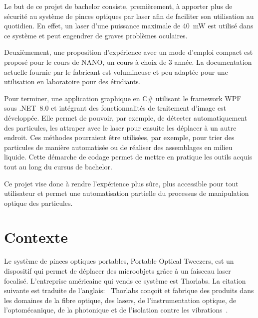 Le but de ce projet de bachelor consiste, premièrement, à apporter plus de sécurité au système de pinces optiques par laser afin de faciliter son utilisation au quotidien. En effet, un laser d'une puissance maximale de 40~mW est utilisé dans ce système et peut engendrer de graves problèmes oculaires.

Deuxièmement, une proposition d'expérience avec un mode d'emploi compact est proposé pour le cours de NANO, un cours à choix de 3\ieme{} année. La documentation actuelle fournie par le fabricant est volumineuse et peu adaptée pour une utilisation en laboratoire pour des étudiants.

Pour terminer, une application graphique en C\# utilisant le framework WPF sous .NET~8.0 et intégrant des fonctionnalités de traitement d'image est développée. Elle permet de pouvoir, par exemple, de détecter automatiquement des particules, les attraper avec le laser pour ensuite les déplacer à un autre endroit. Ces méthodes pourraient être utilisées, par exemple, pour trier des particules de manière automatisée ou de réaliser des assemblages en milieu liquide. Cette démarche de codage permet de mettre en pratique les outils acquis tout au long du cursus de bachelor.

Ce projet vise donc à rendre l'expérience plus sûre, plus accessible pour tout utilisateur et permet une automatisation partielle du processus de manipulation optique des particules.
\newpage
\section{Contexte}

Le système de pinces optiques portables, Portable Optical Tweezers, est un dispositif qui permet de déplacer des microobjets grâce à un faisceau laser focalisé. L'entreprise américaine qui vends ce système est Thorlabs. La citation suivante est traduite de l'anglais: \guillemotleft{}~Thorlabs conçoit et fabrique des produits dans les domaines de la fibre optique, des lasers, de l'instrumentation optique, de l'optomécanique, de la photonique et de l'isolation contre les vibrations~\guillemotright{}\cite{thorlabsWikipedia}.

